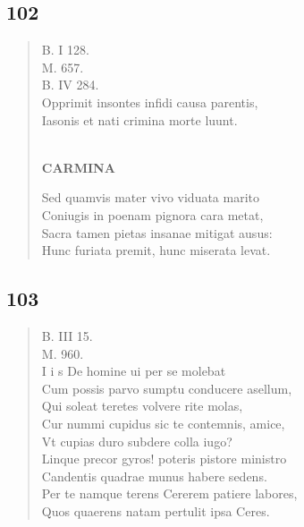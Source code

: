 \documentclass[11pt, a4paper]{report}
\begin{document}
            \subsection*{102}
      \begin{verse}
      B. I 128. \\ M. 657. \\ B. IV 284. \\ Opprimit insontes infidi causa parentis, \\ Iasonis et nati crimina morte luunt. \\ 
        ﻿\pagebreak 
     \marginpar{[102]} \begin{center} \textbf{CARMINA} \end{center}Sed quamvis mater vivo viduata marito \\ Coniugis in poenam pignora cara metat, \\ Sacra tamen pietas insanae mitigat ausus: \\ Hunc furiata premit, hunc miserata levat. \\ 
      \end{verse}
  
            \subsection*{103}
      \begin{verse}
      B. III 15. \\ M. 960. \\ I i s De homine ui per se molebat \\ Cum possis parvo sumptu conducere asellum, \\ Qui soleat teretes volvere rite molas, \\ Cur nummi cupidus sic te contemnis, amice, \\ Vt cupias duro subdere colla iugo? \\ Linque precor gyros! poteris pistore ministro \\ Candentis quadrae munus habere sedens. \\ Per te namque terens Cererem patiere labores, \\ Quos quaerens natam pertulit ipsa Ceres. \\ 
      \end{verse}
  
\end{document}
